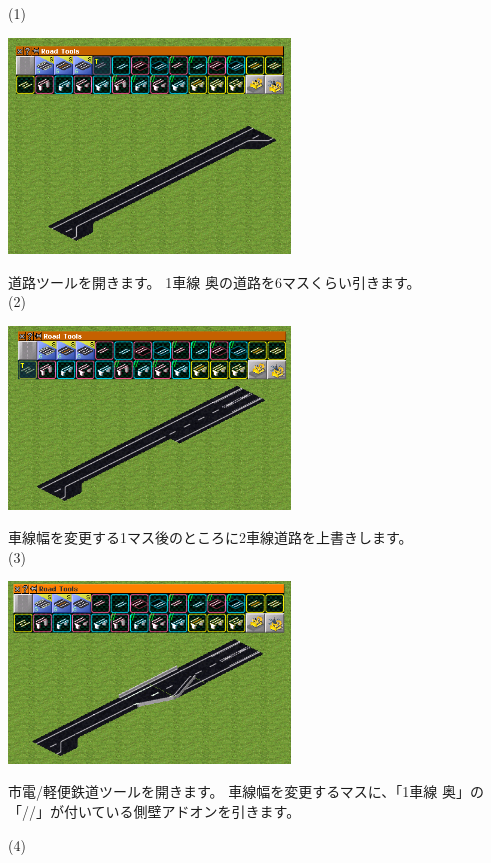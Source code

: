 \documentclass{jbook}
\begin{document}
\begin{multicols}{2}

  (1)

\includegraphics[width = 75mm]{picture/20210214-road-5-1.png}

道路ツールを開きます。
1車線 奥の道路を6マスくらい引きます。\\

(2)

\includegraphics[width = 75mm]{picture/20210214-road-5-2.png}

車線幅を変更する1マス後のところに2車線道路を上書きします。\\

(3)

\includegraphics[width = 75mm]{picture/20210214-road-5-3.png}

市電/軽便鉄道ツールを開きます。
車線幅を変更するマスに、「1車線 奥」の「//」が付いている側壁アドオンを引きます。



(4)


\end{multicols}
\end{document}
